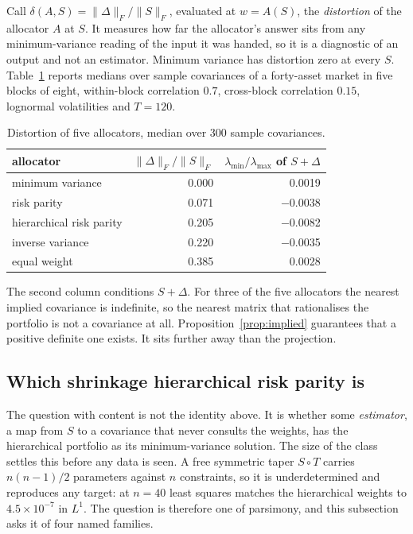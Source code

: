 \documentclass[11pt]{article}
\theoremstyle{remark}
\begin{document}
Call $\delta(A, S) = \|\Delta\|_F / \|S\|_F$, evaluated at $w = A(S)$, the
\emph{distortion} of the allocator $A$ at $S$. It measures how far the
allocator's answer sits from any minimum-variance reading of the input it was
handed, so it is a diagnostic of an output and not an estimator. Minimum
variance has distortion zero at every $S$. Table~\ref{tab:distortion} reports medians
over sample covariances of a forty-asset market in five blocks of eight,
within-block correlation $0.7$, cross-block correlation $0.15$, lognormal
volatilities and $T = 120$.

\begin{table}[ht]
\centering
\begin{tabular}{lrr}
\toprule
allocator & $\|\Delta\|_F/\|S\|_F$ & $\lambda_{\min}/\lambda_{\max}$ of $S+\Delta$ \\
\midrule
minimum variance  & 0.000 & \phantom{$-$}0.0019 \\
risk parity       & 0.071 & $-$0.0038 \\
hierarchical risk parity & 0.205 & $-$0.0082 \\
inverse variance  & 0.220 & $-$0.0035 \\
equal weight      & 0.385 & \phantom{$-$}0.0028 \\
\bottomrule
\end{tabular}
\caption{Distortion of five allocators, median over 300 sample covariances.}
\label{tab:distortion}
\end{table}

The second column conditions $S + \Delta$. For three of the five allocators
the nearest implied covariance is indefinite, so the nearest matrix that
rationalises the portfolio is not a covariance at all.
Proposition~\ref{prop:implied} guarantees that a positive definite one
exists. It sits further away than the projection.

\subsection{Which shrinkage hierarchical risk parity is}
\label{sec:whichshrinkage}

The question with content is not the identity above. It is whether some
\emph{estimator}, a map from $S$ to a covariance that never consults the
weights, has the hierarchical portfolio as its minimum-variance solution.
The size of the class settles this before any data is seen. A free symmetric
taper $S \circ T$ carries $n(n-1)/2$ parameters against $n$ constraints, so
it is underdetermined and reproduces any target: at $n = 40$ least squares
matches the hierarchical weights to $4.5 \times 10^{-7}$ in $L^1$. The
question is therefore one of parsimony, and this subsection asks it of four
named families.
\end{document}
